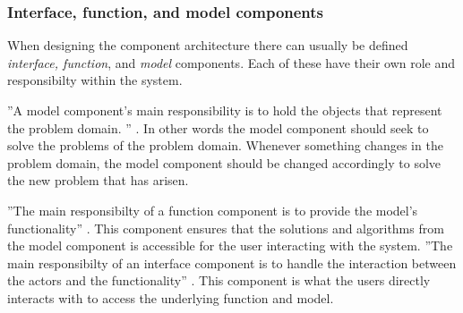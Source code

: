 \subsubsection*{Interface, function, and model components}

When designing the component architecture there can usually be defined \textit{interface, function}, and \textit{model} components.
Each of these have their own role and responsibilty within the system.

''A model component's main responsibility is to hold the objects that represent the problem domain. '' \citep[p.~203]{Rod-Aalborg}.
In other words the model component should seek to solve the problems of the problem domain.
Whenever something changes in the problem domain, the model component should be changed accordingly to solve the new problem that has arisen.

''The main responsibilty of a function component is to provide the model's functionality'' \citep[p.~205]{Rod-Aalborg}.
This component ensures that the solutions and algorithms from the model component is accessible for the user interacting with the system.
''The main responsibilty of an interface component is to handle the interaction between the actors and the functionality'' \citep[p.~207]{Rod-Aalborg}.
This component is what the users directly interacts with to access the underlying function and model.
